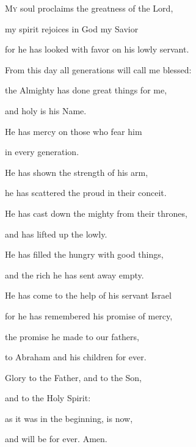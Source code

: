 \lettrine[loversize=0.15,lines=2]{M}{y} soul proclaims the greatness of the Lord,~\GreStar{}~\nopagebreak \par \hspace{10pt} my spirit rejoices in God my Savior

\noindent for he has looked with favor on his lowly servant.~\GreStar{}~\nopagebreak

From this day all generations will call me blessed:

\noindent the Almighty has done great things for me,~\GreStar{}~\nopagebreak

and holy is his Name.

\noindent He has mercy on those who fear him~\GreStar{}~\nopagebreak

in every generation.

\noindent He has shown the strength of his arm,~\GreStar{}~\nopagebreak

he has scattered the proud in their conceit.

\noindent He has cast down the mighty from their thrones,~\GreStar{}~\nopagebreak

and has lifted up the lowly.

\noindent He has filled the hungry with good things,~\GreStar{}~\nopagebreak

and the rich he has sent away empty.

\noindent He has come to the help of his servant Israel~\GreStar{}~\nopagebreak

for he has remembered his promise of mercy,

\noindent the promise he made to our fathers,~\GreStar{}~\nopagebreak

to Abraham and his children for ever.

\noindent Glory to the Father, and to the Son,~\GreStar{}~\nopagebreak

and to the Holy Spirit:

\noindent as it was in the beginning, is now,~\GreStar{}~\nopagebreak

and will be for ever. Amen.
